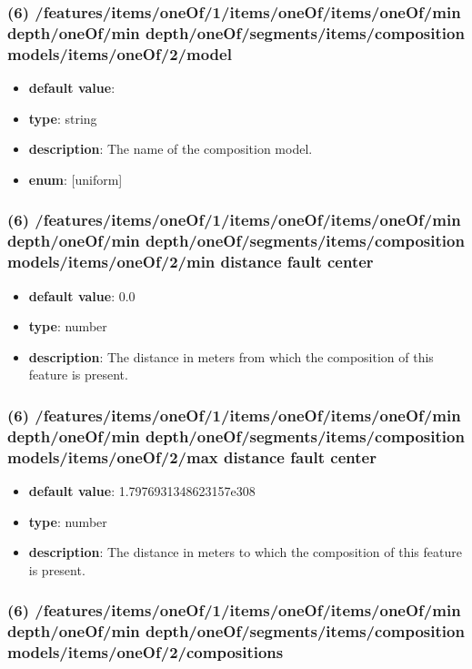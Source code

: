 \subsubsection{(6) /features/items/oneOf/1/items/oneOf/items/oneOf/min depth/oneOf/min depth/oneOf/segments/items/composition models/items/oneOf/2/model}
\begin{itemize}[leftmargin=6em]\item {\bf default value}: 
\item {\bf type}: string
\item {\bf description}: The name of the composition model.
\item {\bf enum}: [uniform]\end{itemize}\subsubsection{(6) /features/items/oneOf/1/items/oneOf/items/oneOf/min depth/oneOf/min depth/oneOf/segments/items/composition models/items/oneOf/2/min distance fault center}
\begin{itemize}[leftmargin=6em]\item {\bf default value}: 0.0
\item {\bf type}: number
\item {\bf description}: The distance in meters from which the composition of this feature is present.
\end{itemize}\subsubsection{(6) /features/items/oneOf/1/items/oneOf/items/oneOf/min depth/oneOf/min depth/oneOf/segments/items/composition models/items/oneOf/2/max distance fault center}
\begin{itemize}[leftmargin=6em]\item {\bf default value}: 1.7976931348623157e308
\item {\bf type}: number
\item {\bf description}: The distance in meters to which the composition of this feature is present.
\end{itemize}\subsubsection{(6) /features/items/oneOf/1/items/oneOf/items/oneOf/min depth/oneOf/min depth/oneOf/segments/items/composition models/items/oneOf/2/compositions}
